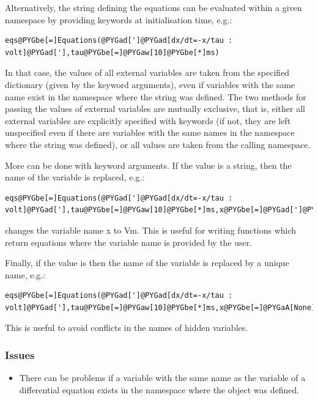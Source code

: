 \documentclass[letterpaper,10pt,english]{manual}
\begin{document}
Alternatively, the string defining the equations can be evaluated within a given namespace
by providing keywords at initialisation time, e.g.:

\begin{Verbatim}[commandchars=@\[\]]
eqs@PYGbe[=]Equations(@PYGad[']@PYGad[dx/dt=-x/tau : volt]@PYGad['],tau@PYGbe[=]@PYGaw[10]@PYGbe[*]ms)
\end{Verbatim}

In that case, the values of all external variables are taken from the specified
dictionary (given by the keyword arguments), even if variables with the same name
exist in the namespace where the string was defined. The two methods for passing the
values of external variables are mutually exclusive, that is, either all external variables
are explicitly specified with keywords (if not, they are left unspecified even if there
are variables with the same names in the namespace where the string was defined), or all
values are taken from the calling namespace.

More can be done with keyword arguments. If the value is a string, then the name of the
variable is replaced, e.g.:

\begin{Verbatim}[commandchars=@\[\]]
eqs@PYGbe[=]Equations(@PYGad[']@PYGad[dx/dt=-x/tau : volt]@PYGad['],tau@PYGbe[=]@PYGaw[10]@PYGbe[*]ms,x@PYGbe[=]@PYGad[']@PYGad[Vm]@PYGad['])
\end{Verbatim}

changes the variable name x to Vm. This is useful for writing functions which return
equations where the variable name is provided by the user.

Finally, if the value is  then the name of the variable is replaced by a unique
name, e.g.:

\begin{Verbatim}[commandchars=@\[\]]
eqs@PYGbe[=]Equations(@PYGad[']@PYGad[dx/dt=-x/tau : volt]@PYGad['],tau@PYGbe[=]@PYGaw[10]@PYGbe[*]ms,x@PYGbe[=]@PYGaA[None])
\end{Verbatim}

This is useful to avoid conflicts in the names of hidden variables.


\subsubsection{Issues}
\begin{itemize}
\item {} 
There can be problems if a variable with the same name as the variable of a
differential equation exists in the namespace where the \hyperlink{brian.Equations}{} object was defined.

\end{itemize}
\end{document}
